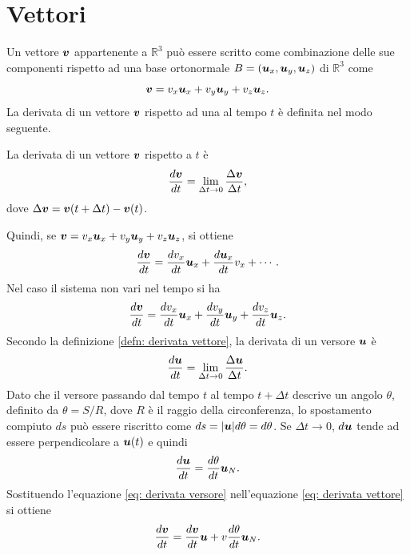 \chapter{Vettori}
Un vettore $\bm{v}$ appartenente a $\mathbb{R}^3$ può essere scritto come combinazione delle sue componenti rispetto ad una base ortonormale $B=(\bm{u}_x,\bm{u}_y,\bm{u}_z)$ di $\mathbb{R}^3$ come
\begin{equation}\label{eq:scomposizione}
    \bm{v}=v_x\bm{u}_x+v_y\bm{u}_y+v_z\bm{u}_z.
\end{equation}
La derivata di un vettore $\bm{v}$ rispetto ad una al tempo $t$ è definita nel modo seguente.
\begin{defn}\label{defn: derivata vettore}
    La derivata di un vettore $\bm{v}$ rispetto a $t$ è
    \begin{equation}
        \frac{d\bm{v}}{dt}=\lim_{\Delta t\to0}{\frac{\Delta \bm{v}}{\Delta t}},
    \end{equation}
    dove $\Delta \bm{v}=\bm{v}(t+\Delta t)-\bm{v}(t)$.
\end{defn}
Quindi, se $\bm{v}=v_x\bm{u}_x+v_y\bm{u}_y+v_z\bm{u}_z$, si ottiene
\begin{equation}\label{eq: derivata vettore}
    \frac{d\bm{v}}{dt}=\frac{dv_x}{dt}\bm{u}_x+\frac{d\bm{u}_x}{dt}v_x+\cdots.
\end{equation}
Nel caso il sistema non vari nel tempo si ha
\begin{equation}
    \frac{d\bm{v}}{dt}=\frac{dv_x}{dt}\bm{u}_x+\frac{dv_y}{dt}\bm{u}_y+\frac{dv_z}{dt}\bm{u}_z.
\end{equation}
Secondo la definizione \ref{defn: derivata vettore}, la derivata di un versore $\bm{u}$ è
\begin{equation}
    \frac{d\bm{u}}{dt}=\lim_{\Delta t\to0}{\frac{\Delta\bm{u}}{\Delta t}}.
\end{equation}
Dato che il versore passando dal tempo $t$ al tempo $t+\Delta t$ descrive un angolo $\theta$, definito da $\theta=S/R$, dove $R$ è il raggio della circonferenza, lo spostamento compiuto $ds$ può essere riscritto come $ds=|\bm{u}|d\theta=d\theta$. Se $\Delta t\to0$, $d\bm{u}$ tende ad essere perpendicolare a $\bm{u}(t)$ e quindi
\begin{equation}\label{eq: derivata versore}
    \frac{d\bm{u}}{dt}=\frac{d\theta}{dt}\bm{u}_N.
\end{equation}
Sostituendo l'equazione \eqref{eq: derivata versore} nell'equazione \eqref{eq: derivata vettore} si ottiene
\begin{equation}
    \frac{d\bm{v}}{dt}=\frac{d\bm{v}}{dt}\bm{u}+v\frac{d\theta}{dt}\bm{u}_N.
\end{equation}
